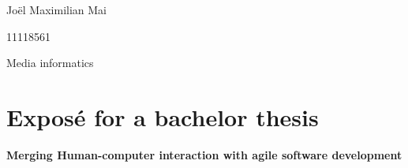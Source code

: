 \begin{titlepage}
Joël Maximilian Mai 
\vspace{0.1cm}

11118561 
\vspace{0.1cm}

Media informatics 
\vspace{2cm}

\section*{Exposé for a bachelor thesis}
\vspace{0.4cm}

\begin{LARGE}
\textbf{Merging Human-computer interaction with agile software development} 	
\end{LARGE}

\vspace{2cm}
\tableofcontents

\end{titlepage}
